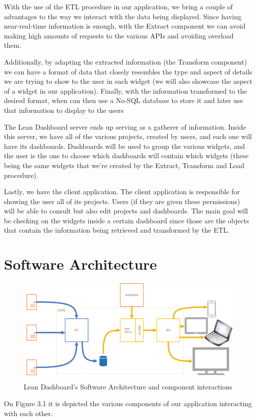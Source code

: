 \documentclass[a4paper,twoside,10pt]{report}
\begin{document}
With the use of the ETL procedure in our application, we bring a couple of advantages to the way we interact with the data being displayed. Since having near-real-time information is enough, with the Extract component we can avoid making high amounts of requests to the various APIs and avoiding overload them.
 
Additionally, by adapting the extracted information (the Transform component) we can have a format of data that closely resembles the type and aspect of details we are trying to show to the user in each widget (we will also showcase the aspect of a widget in our application). Finally, with the information transformed to the desired format, when can then use a No-SQL database to store it and later use that information to display to the users 
 
The Lean Dashboard server ends up serving as a gatherer of information. Inside this server, we have all of the various projects, created by users, and each one will have its dashboards. Dashboards will be used to group the various widgets, and the user is the one to choose which dashboards will contain which widgets (these being the same widgets that we're created by the Extract, Transform and Load procedure).
 
Lastly, we have the client application. The client application is responsible for showing the user all of its projects. Users (if they are given these permissions) will be able to consult but also edit projects and dashboards. The main goal will be checking on the widgets inside a certain dashboard since those are the objects that contain the information being retrieved and transformed by the ETL.

\section{Software Architecture}
\begin{figure}[h!]
\center
    \includegraphics[width=\textwidth]{lean-dashboard-software-architecture.png}
    \caption{Lean Dashboard's Software Architecture and component interactions}
\end{figure}
On Figure 3.1 it is depicted the various components of our application interacting with each other.
\end{document}
